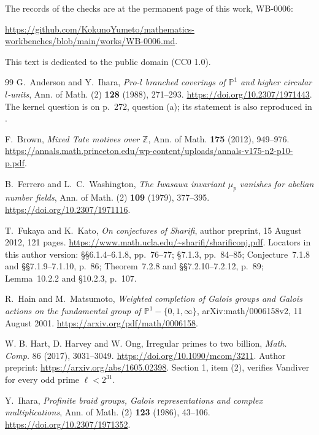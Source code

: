 \documentclass[11pt]{article}
\theoremstyle{definition}
\newcommand{\workbenchurl}{https://github.com/KokunoYumeto/mathematics-workbenches/blob/main/works/WB-0006.md}
\numberwithin{equation}{section}
\begin{document}
The records of the checks are at the permanent page of this work, WB-0006:

{\raggedright\smallskip\noindent\url{\workbenchurl}.\par}

\smallskip
This text is dedicated to the public domain (CC0 1.0).

\begingroup
\small
\begin{thebibliography}{99}
G.~Anderson and Y.~Ihara, \emph{Pro-$l$ branched coverings of $\mathbb P^1$ and higher circular $l$-units},
Ann. of Math. (2) \textbf{128} (1988), 271--293.
\url{https://doi.org/10.2307/1971443}.
The kernel question is on p.~272, question (a); its statement is also reproduced in
\cite[p.~2]{IshiiKernel2026}.

F.~Brown, \emph{Mixed Tate motives over $\mathbb Z$},
Ann. of Math. \textbf{175} (2012), 949--976.
\url{https://annals.math.princeton.edu/wp-content/uploads/annals-v175-n2-p10-p.pdf}.

B.~Ferrero and L.~C.~Washington,
\emph{The Iwasawa invariant $\mu_p$ vanishes for abelian number fields},
Ann. of Math. (2) \textbf{109} (1979), 377--395.
\url{https://doi.org/10.2307/1971116}.

T.~Fukaya and K.~Kato,
\emph{On conjectures of Sharifi}, author preprint,
15 August 2012, 121 pages.
\url{https://www.math.ucla.edu/~sharifi/sharificonj.pdf}.
Locators in this author version:
\S\S6.1.4--6.1.8, pp.~76--77;
\S7.1.3, pp.~84--85;
Conjecture~7.1.8 and \S\S7.1.9--7.1.10, p.~86;
Theorem~7.2.8 and \S\S7.2.10--7.2.12, p.~89;
Lemma~10.2.2 and \S10.2.3, p.~107.

R.~Hain and M.~Matsumoto, \emph{Weighted completion of Galois groups
and Galois actions on the fundamental group of $\mathbb P^1-\{0,1,\infty\}$},
arXiv:math/0006158v2, 11 August 2001.
\url{https://arxiv.org/pdf/math/0006158}.

W. B. Hart, D. Harvey and W. Ong,
Irregular primes to two billion,
\emph{Math. Comp.} 86 (2017), 3031--3049.
\url{https://doi.org/10.1090/mcom/3211}.
Author preprint:
\url{https://arxiv.org/abs/1605.02398}.
Section 1, item (2), verifies Vandiver for every odd prime
\(\ell<2^{31}\).

Y.~Ihara, \emph{Profinite braid groups, Galois representations and complex multiplications},
Ann. of Math. (2) \textbf{123} (1986), 43--106.
\url{https://doi.org/10.2307/1971352}.


\end{thebibliography}
\end{document}
